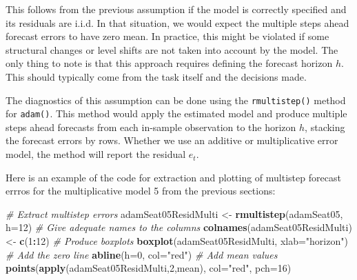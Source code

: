 \documentclass[]{book}
\newenvironment{Shaded}{\begin{snugshade}}{\end{snugshade}}
\newcommand{\CommentTok}[1]{\textcolor[rgb]{0.56,0.35,0.01}{\textit{#1}}}
\newcommand{\DataTypeTok}[1]{\textcolor[rgb]{0.13,0.29,0.53}{#1}}
\newcommand{\DecValTok}[1]{\textcolor[rgb]{0.00,0.00,0.81}{#1}}
\newcommand{\KeywordTok}[1]{\textcolor[rgb]{0.13,0.29,0.53}{\textbf{#1}}}
\newcommand{\NormalTok}[1]{#1}
\newcommand{\OperatorTok}[1]{\textcolor[rgb]{0.81,0.36,0.00}{\textbf{#1}}}
\newcommand{\StringTok}[1]{\textcolor[rgb]{0.31,0.60,0.02}{#1}}
\theoremstyle{definition}
\theoremstyle{definition}
\theoremstyle{definition}
\theoremstyle{definition}
\theoremstyle{remark}
\begin{document}
This follows from the previous assumption if the model is correctly specified and its residuals are i.i.d. In that situation, we would expect the multiple steps ahead forecast errors to have zero mean. In practice, this might be violated if some structural changes or level shifts are not taken into account by the model. The only thing to note is that this approach requires defining the forecast horizon \(h\). This should typically come from the task itself and the decisions made.

The diagnostics of this assumption can be done using the \texttt{rmultistep()} method for \texttt{adam()}. This method would apply the estimated model and produce multiple steps ahead forecasts from each in-sample observation to the horizon \(h\), stacking the forecast errors by rows. Whether we use an additive or multiplicative error model, the method will report the residual \(e_t\).

Here is an example of the code for extraction and plotting of multistep forecast errros for the multiplicative model 5 from the previous sections:

\begin{Shaded}
\begin{Highlighting}[]
\CommentTok{# Extract multistep errors}
\NormalTok{adamSeat05ResidMulti <-}\StringTok{ }\KeywordTok{rmultistep}\NormalTok{(adamSeat05, }\DataTypeTok{h=}\DecValTok{12}\NormalTok{)}
\CommentTok{# Give adequate names to the columns}
\KeywordTok{colnames}\NormalTok{(adamSeat05ResidMulti) <-}\StringTok{ }\KeywordTok{c}\NormalTok{(}\DecValTok{1}\OperatorTok{:}\DecValTok{12}\NormalTok{)}
\CommentTok{# Produce boxplots}
\KeywordTok{boxplot}\NormalTok{(adamSeat05ResidMulti, }\DataTypeTok{xlab=}\StringTok{"horizon"}\NormalTok{)}
\CommentTok{# Add the zero line}
\KeywordTok{abline}\NormalTok{(}\DataTypeTok{h=}\DecValTok{0}\NormalTok{, }\DataTypeTok{col=}\StringTok{"red"}\NormalTok{)}
\CommentTok{# Add mean values}
\KeywordTok{points}\NormalTok{(}\KeywordTok{apply}\NormalTok{(adamSeat05ResidMulti,}\DecValTok{2}\NormalTok{,mean), }\DataTypeTok{col=}\StringTok{"red"}\NormalTok{, }\DataTypeTok{pch=}\DecValTok{16}\NormalTok{)}
\end{Highlighting}
\end{Shaded}
\end{document}
